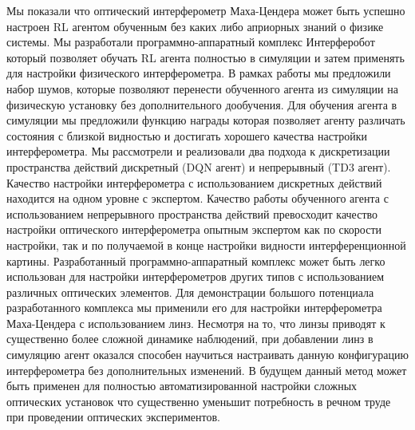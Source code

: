 Мы показали что оптический интерферометр Маха-Цендера может быть успешно настроен RL агентом обученным без каких либо априорных знаний о физике системы. 
Мы разработали программно-аппаратный комплекс Интерферобот который позволяет обучать RL агента полностью в симуляции и затем применять для настройки физического интерферометра. В рамках работы мы предложили набор шумов, которые позволяют перенести обученного агента из симуляции на физическую установку без дополнительного дообучения. Для обучения агента в симуляции мы предложили функцию награды которая позволяет агенту различать состояния с близкой видностью и достигать хорошего качества настройки интерферометра. 
Мы рассмотрели и реализовали два подхода к дискретизации пространства действий дискретный (DQN агент) и непрерывный (TD3 агент). Качество настройки интерферометра с использованием дискретных действий находится на одном уровне с экспертом. Качество работы обученного агента с использованием непрерывного пространства действий превосходит качество настройки оптического интерферометра опытным экспертом как по скорости настройки, так и по получаемой в конце настройки видности интерференционной картины. 
Разработанный программно-аппаратный комплекс может быть легко использован для настройки интерферометров других типов с использованием различных оптических элементов. Для демонстрации большого потенциала разработанного комплекса мы применили его для настройки интерферометра Маха-Цендера с использованием линз. Несмотря на то, что линзы приводят к существенно более сложной динамике наблюдений, при добавлении линз в симуляцию агент оказался способен научиться настраивать данную конфигурацию интерферометра без дополнительных изменений. В будущем данный метод может быть применен для полностью автоматизированной настройки сложных оптических установок что существенно уменьшит потребность в речном труде при проведении оптических экспериментов.  


\FloatBarrier
